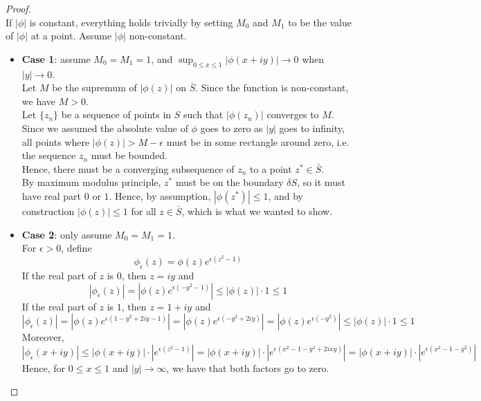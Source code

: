 \begin{proof}
    ~\\
    If $|\phi|$ is constant, everything holds trivially by setting $M_0$ and $M_1$ to be the value of $|\phi|$ at a point. Assume $|\phi|$ non-constant.\\
    \begin{itemize}
        \item{ \textbf{Case 1}: assume $M_0=M_1=1$, and $\sup_{0 \leq x \leq 1} | \phi(x+iy) | \to 0$ when $|y| \to 0$.\\
        Let $M$ be the supremum of $|\phi(z)|$ on $\bar{S}$. Since the function is non-constant, we have $M>0$.\\
        Let $\{z_n\}$ be a sequence of points in $S$ such that $|\phi(z_n)|$ converges to $M$.\\
        Since we assumed the absolute value of $\phi$ goes to zero as $|y|$ goes to infinity, all points where $|\phi(z)|>M-\epsilon$ must be in some rectangle around zero, i.e. the sequence ${z_n}$ must be bounded.\\
        Hence, there must be a converging subsequence of ${z_n}$ to a point $z^* \in \bar{S}$.\\
        By maximum modulus principle, $z^*$ must be on the boundary $\delta S$, so it must have real part $0$ or $1$.
        Hence, by assumption, $|\phi(z^*)|\leq 1$, and by construction $|\phi(z)|\leq 1$ for all $z \in \bar{S}$, which is what we wanted to show.
        }
        \item{ \textbf{Case 2}: only assume $M_0 = M_1 = 1$.\\
        For $\epsilon>0$, define
        \[ \phi_{\epsilon} (z) = \phi(z) e^{\epsilon (z^2 - 1)} \]
        If the real part of $z$ is $0$, then $z=iy$ and
        \[ | \phi_{\epsilon} (z) | = |\phi(z) e^{\epsilon (-y^2-1)}| \leq |\phi(z)| \cdot 1 \leq 1\]
        If the real part of $z$ is $1$, then $z=1+iy$ and
        \[ | \phi_{\epsilon} (z) | = |\phi(z) e^{\epsilon (1 -y^2 + 2iy -1)}| = |\phi(z) e^{\epsilon (-y^2 + 2iy)}| = |\phi(z) e^{\epsilon (-y^2)}| \leq |\phi(z)| \cdot 1 \leq 1 \]
        Moreover,
        \[ | \phi_{\epsilon} (x+iy)| \leq |\phi(x+iy)| \cdot |e^{\epsilon(z^2-1)}| = |\phi(x+iy)| \cdot |e^{\epsilon(x^2-1-y^2+2ixy)}| = |\phi(x+iy)| \cdot |e^{\epsilon(x^2-1-y^2)}| \]
        Hence, for $0\leq x \leq 1$ and $|y| \to \infty$, we have that both factors go to zero.\\
}
\end{itemize}
\end{proof}
